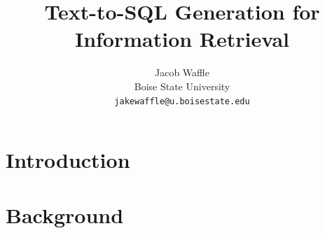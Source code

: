 \documentclass[11pt]{article}
\title{Text-to-SQL Generation for Information Retrieval}
\author{
    Jacob Waffle \\
    Boise State University\\
    \texttt{jakewaffle@u.boisestate.edu} \\
}
\begin{document}
\maketitle
\begin{abstract}

\end{abstract}

\section{Introduction}





\section{Background}

\end{document}
